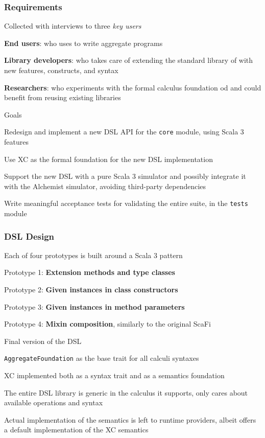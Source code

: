 \begin{frame}
    \frametitle{Requirements}
    \begin{blockitems}{Collected with interviews to three \textit{key users}}
        \item \textbf{End users}: who uses \this to write aggregate programs
        \item \textbf{Library developers}: who takes care of extending the standard library of \this with new features, constructs, and syntax
        \item \textbf{Researchers}: who experiments with the formal calculus foundation od \this and could benefit from reusing existing libraries
    \end{blockitems}
    \begin{blockitems}{Goals}
        \item Redesign and implement a new \ac{DSL} \ac{API} for the \texttt{core} module, using Scala 3 features
        \item Use \ac{XC} as the formal foundation for the new \ac{DSL} implementation
        \item Support the new \ac{DSL} with a pure Scala 3 simulator and possibly integrate it with the Alchemist simulator, avoiding third-party dependencies
        \item Write meaningful acceptance tests for validating the entire suite, in the \texttt{tests} module
    \end{blockitems}
\end{frame}

\begin{frame}
    \frametitle{\ac{DSL} Design}
    \begin{blockitems}{Each of four prototypes is built around a Scala 3 pattern}
        \item Prototype 1: \textbf{Extension methods and type classes}
        \item Prototype 2: \textbf{Given instances in class constructors}
        \item Prototype 3: \textbf{Given instances in method parameters}
        \item Prototype 4: \textbf{Mixin composition}, similarly to the original ScaFi
    \end{blockitems}
    \begin{blockitems}{Final version of the \ac{DSL}}
        \item \texttt{AggregateFoundation} as the base trait for all calculi syntaxes
        \item \ac{XC} implemented both as a syntax trait and as a semantics foundation
        \item The entire \ac{DSL} library is generic in the calculus it supports, only cares about available operations and syntax
        \item Actual implementation of the semantics is left to runtime providers, albeit \this offers a default implementation of the \ac{XC} semantics
    \end{blockitems}
\end{frame}

